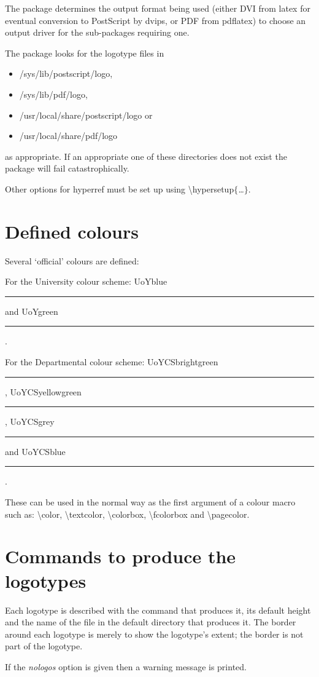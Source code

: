 \documentclass[12pt,a4paper]{scrartcl}
\DeclareRobustCommand{\cmd}[2]{\textsf{\textbackslash#1}\textit{#2}}
\begin{document}
The package determines the output format being used (either DVI from
\textsf{latex} for eventual conversion to PostScript by
\textsf{dvips}, or PDF from \textsf{pdflatex}) to choose an output
driver for the sub-packages requiring one.

The package looks for the logotype files in
\begin{itemize}
\item \textsf{/sys/lib/postscript/logo},
\item \textsf{/sys/lib/pdf/logo},
\item \textsf{/usr/local/share/postscript/logo} or
\item \textsf{/usr/local/share/pdf/logo}
\end{itemize}
as appropriate.  If an appropriate one of these directories does not
exist the package will fail catastrophically.

Other options for \textsf{hyperref} must be set up using
\cmd{hypersetup}{$\{$\ldots$\}$}.

\section{Defined colours}
\label{sec:colour}
\newcommand*{\showcol}[1]{\textsf{#1}~\textcolor{#1}{\rule{1em}{1em}}}
Several `official' colours are defined:

For the University colour scheme: \showcol{UoYblue} and
\showcol{UoYgreen}.

For the Departmental colour scheme: \showcol{UoYCSbrightgreen},
\showcol{UoYCSyellowgreen}, \showcol{UoYCSgrey} and
\showcol{UoYCSblue}.

These can be used in the normal way as the first argument of a colour
macro such as: \cmd{color}{}, \cmd{textcolor}{}, \cmd{colorbox}{},
\cmd{fcolorbox}{} and \cmd{pagecolor}{}.

\section{Commands to produce the logotypes}
\label{sec:logotype}

Each logotype is described with the command that produces it, its
default height and the name of the file in the default directory that
produces it.  The border around each logotype is merely to show the
logotype's extent; the border is not part of the logotype.

If the \emph{nologos} option is given then a warning message is
printed.
\end{document}
